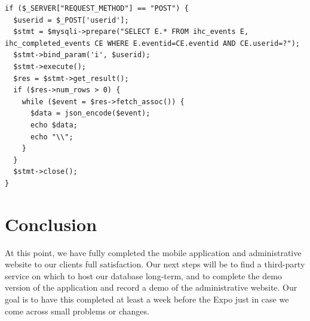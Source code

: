 \documentclass[onecolumn, draftclsnofoot,10pt, compsoc]{IEEEtran}
\begin{document}
    \begin{lstlisting}[style=php]
if ($_SERVER["REQUEST_METHOD"] == "POST") {
  $userid = $_POST['userid'];
  $stmt = $mysqli->prepare("SELECT E.* FROM ihc_events E, ihc_completed_events CE WHERE E.eventid=CE.eventid AND CE.userid=?");
  $stmt->bind_param('i', $userid);
  $stmt->execute();
  $res = $stmt->get_result();
  if ($res->num_rows > 0) {
    while ($event = $res->fetch_assoc()) {
      $data = json_encode($event);
      echo $data;
      echo "\\";
    }
  }
  $stmt->close();
}
    \end{lstlisting}

\section{Conclusion}
  At this point, we have fully completed the mobile application and administrative website to our clients full satisfaction. Our next steps will be to find a third-party service on which to host our database long-term, and to complete the demo version of the application and record a demo of the administrative website. Our goal is to have this completed at least a week before the Expo just in case we come across small problems or changes.
\end{document}
